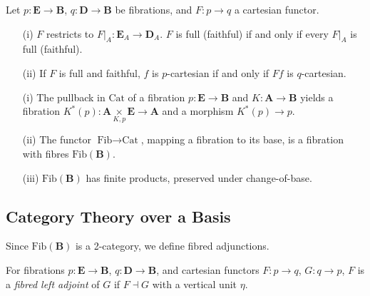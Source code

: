 \documentclass{article}
\begin{document}
\begin{lemma}
\label{lem:2.5}
Let $p : \mathbf{E} \to \mathbf{B}$, $q : \mathbf{D} \to \mathbf{B}$ be fibrations, and $F : p \to q$ a cartesian functor.
\begin{enumerate}
    \item[(i)] $F$ restricts to $\left.F\right|_A : \mathbf{E}_A \to \mathbf{D}_A$. $F$ is full (faithful) if and only if every $\left.F\right|_A$ is full (faithful).
    \item[(ii)] If $F$ is full and faithful, $f$ is $p$-cartesian if and only if $F f$ is $q$-cartesian.
\end{enumerate}
\end{lemma}

\begin{proposition}
\label{prop:2.6}
\begin{enumerate}
    \item[(i)] The pullback in $\text{Cat}$ of a fibration $p : \mathbf{E} \to \mathbf{B}$ and $K : \mathbf{A} \to \mathbf{B}$ yields a fibration $K^*(p) : \mathbf{A} \underset{K, p}{\times} \mathbf{E} \to \mathbf{A}$ and a morphism $K^*(p) \to p$.
    \item[(ii)] The functor $\text{Fib} \to \text{Cat}$, mapping a fibration to its base, is a fibration with fibres $\text{Fib}(\mathbf{B})$.
    \item[(iii)] $\text{Fib}(\mathbf{B})$ has finite products, preserved under change-of-base.
\end{enumerate}
\end{proposition}

\newpage
\subsection{Category Theory over a Basis}
\label{sec:category-theory-basis}

Since $\text{Fib}(\mathbf{B})$ is a 2-category, we define fibred adjunctions.

\begin{definition}
\label{def:3.1}
For fibrations $p : \mathbf{E} \to \mathbf{B}$, $q : \mathbf{D} \to \mathbf{B}$, and cartesian functors $F : p \to q$, $G : q \to p$, $F$ is a \emph{fibred left adjoint} of $G$ if $F \dashv G$ with a vertical unit $\eta$.
\end{definition}
\end{document}
